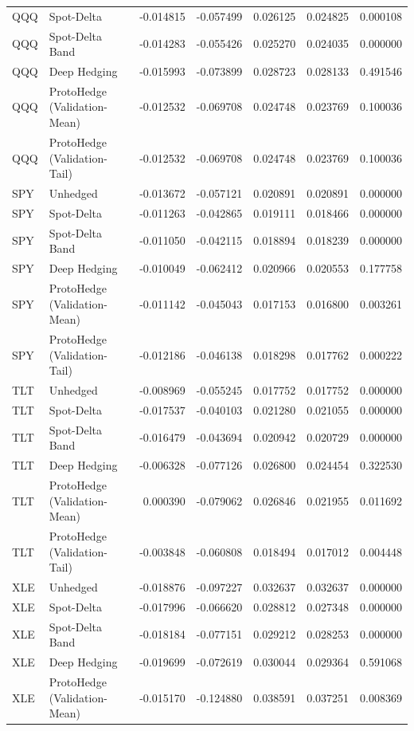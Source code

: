 \begin{tabular}{llrrrrr}
QQQ & Spot-Delta & -0.014815 & -0.057499 & 0.026125 & 0.024825 & 0.000108 \\
QQQ & Spot-Delta Band & -0.014283 & -0.055426 & 0.025270 & 0.024035 & 0.000000 \\
QQQ & Deep Hedging & -0.015993 & -0.073899 & 0.028723 & 0.028133 & 0.491546 \\
QQQ & ProtoHedge (Validation-Mean) & -0.012532 & -0.069708 & 0.024748 & 0.023769 & 0.100036 \\
QQQ & ProtoHedge (Validation-Tail) & -0.012532 & -0.069708 & 0.024748 & 0.023769 & 0.100036 \\
SPY & Unhedged & -0.013672 & -0.057121 & 0.020891 & 0.020891 & 0.000000 \\
SPY & Spot-Delta & -0.011263 & -0.042865 & 0.019111 & 0.018466 & 0.000000 \\
SPY & Spot-Delta Band & -0.011050 & -0.042115 & 0.018894 & 0.018239 & 0.000000 \\
SPY & Deep Hedging & -0.010049 & -0.062412 & 0.020966 & 0.020553 & 0.177758 \\
SPY & ProtoHedge (Validation-Mean) & -0.011142 & -0.045043 & 0.017153 & 0.016800 & 0.003261 \\
SPY & ProtoHedge (Validation-Tail) & -0.012186 & -0.046138 & 0.018298 & 0.017762 & 0.000222 \\
TLT & Unhedged & -0.008969 & -0.055245 & 0.017752 & 0.017752 & 0.000000 \\
TLT & Spot-Delta & -0.017537 & -0.040103 & 0.021280 & 0.021055 & 0.000000 \\
TLT & Spot-Delta Band & -0.016479 & -0.043694 & 0.020942 & 0.020729 & 0.000000 \\
TLT & Deep Hedging & -0.006328 & -0.077126 & 0.026800 & 0.024454 & 0.322530 \\
TLT & ProtoHedge (Validation-Mean) & 0.000390 & -0.079062 & 0.026846 & 0.021955 & 0.011692 \\
TLT & ProtoHedge (Validation-Tail) & -0.003848 & -0.060808 & 0.018494 & 0.017012 & 0.004448 \\
XLE & Unhedged & -0.018876 & -0.097227 & 0.032637 & 0.032637 & 0.000000 \\
XLE & Spot-Delta & -0.017996 & -0.066620 & 0.028812 & 0.027348 & 0.000000 \\
XLE & Spot-Delta Band & -0.018184 & -0.077151 & 0.029212 & 0.028253 & 0.000000 \\
XLE & Deep Hedging & -0.019699 & -0.072619 & 0.030044 & 0.029364 & 0.591068 \\
XLE & ProtoHedge (Validation-Mean) & -0.015170 & -0.124880 & 0.038591 & 0.037251 & 0.008369 \\

\end{tabular}
